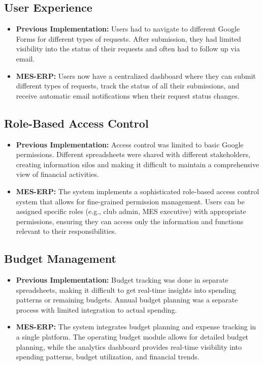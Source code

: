 \documentclass[12pt, titlepage]{article}
\begin{document}
\subsection{User Experience}

\begin{itemize}
    \item \textbf{Previous Implementation:} Users had to navigate to different Google Forms for different types of requests. After submission, they had limited visibility into the status of their requests and often had to follow up via email.
    
    \item \textbf{MES-ERP:} Users now have a centralized dashboard where they can submit different types of requests, track the status of all their submissions, and receive automatic email notifications when their request status changes.
\end{itemize}

\subsection{Role-Based Access Control}

\begin{itemize}
    \item \textbf{Previous Implementation:} Access control was limited to basic Google permissions. Different spreadsheets were shared with different stakeholders, creating information silos and making it difficult to maintain a comprehensive view of financial activities.
    
    \item \textbf{MES-ERP:} The system implements a sophisticated role-based access control system that allows for fine-grained permission management. Users can be assigned specific roles (e.g., club admin, MES executive) with appropriate permissions, ensuring they can access only the information and functions relevant to their responsibilities.
\end{itemize}

\subsection{Budget Management}

\begin{itemize}
    \item \textbf{Previous Implementation:} Budget tracking was done in separate spreadsheets, making it difficult to get real-time insights into spending patterns or remaining budgets. Annual budget planning was a separate process with limited integration to actual spending.
    
    \item \textbf{MES-ERP:} The system integrates budget planning and expense tracking in a single platform. The operating budget module allows for detailed budget planning, while the analytics dashboard provides real-time visibility into spending patterns, budget utilization, and financial trends.
\end{itemize}
\end{document}
